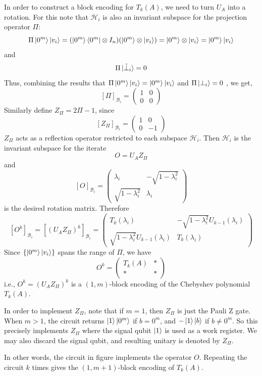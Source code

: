 \documentclass[12pt, oneside]{book}
\theoremstyle{definition}
\theoremstyle{definition}
\theoremstyle{remark}
\begin{document}
In order to construct a block encoding for $T_k(A)$, we need to turn $U_A$ into a rotation. For this note that $\mathcal{H}_i$ is also an invariant subspace for the projection operator $\Pi$:
\[
\Pi\ket{0^m}\ket{v_i}=(\ket{0^m}\bra{0^m} \otimes I_n)(\ket{0^m}\otimes \ket{v_i})=\ket{0^m}\otimes \ket{v_i} =\ket{0^m}\ket{v_i}
\]
and
\[
\Pi\ket{\tilde{\perp}_i} = 0
\]
Thus, combining the results that $\Pi\ket{0^m}\ket{v_i}=\ket{0^m}\ket{v_i}$ and $\Pi\ket{\perp_i}=0$ , we get, 
\[
[\Pi]_{\mathcal{B}_i} = \begin{pmatrix} 1 & 0 \\ 0 & 0 \end{pmatrix}
\]
Similarly define $Z_{\Pi} = 2\Pi -1$, since
\[
[Z_{\Pi}]_{\mathcal{B}_i} = \begin{pmatrix} 1 & 0 \\ 0 & -1 \end{pmatrix}
\]
$Z_{\Pi}$ acts as a reflection operator restricted to each subspace $\mathcal{H}_i$. Then $\mathcal{H}_i$ is the invariant subspace for the iterate
\[
O = U_A Z_{\Pi}
\]
and
\[
[O]_{\mathcal{B}_i} = \begin{pmatrix} \lambda_i & -\sqrt{1-\lambda_i^2} \\
 \sqrt{1-\lambda_i^2} & \lambda_i \end{pmatrix} 
\]
is the desired rotation matrix. Therefore
\[
[O^k]_{\mathcal{B}_i} = [(U_AZ_{\Pi})^k]_{\mathcal{B}_i} = \begin{pmatrix} T_k(\lambda_i) & -\sqrt{1-\lambda_i^2}U_{k-1}(\lambda_i) \\
\sqrt{1-\lambda_i^2} U_{k-1}(\lambda_i) & T_k(\lambda_i) \end{pmatrix}
\]
Since $\{\ket{0^m}\ket{v_i} \}$ spans the range of $\Pi$, we have
\[
O^k = \begin{pmatrix} T_k(A) & * \\ 
* & * \end{pmatrix}
\]
i.e., $O^k = (U_A Z_{\Pi})^k$ is a $(1,m)$-block encoding of the Chebyshev polynomial $T_k(A)$.

In order to implement $Z_{\Pi}$, note that if $m=1$, then $Z_{\Pi}$ is just the Pauli Z gate. When $m>1$, the circuit returns $\ket{1}\ket{0^m}$ if $b=0^m$, and $-\ket{1}\ket{b}$ if $b\neq 0^m$. So this precisely implements $Z_{\Pi}$ where the signal qubit $\ket{1}$ is used as a work register. We may also discard the signal qubit, and resulting unitary is denoted by $Z_{\Pi}$. 

In other words, the circuit in figure implements the operator $O$. Repeating the circuit $k$ times gives the $(1,m+1)$-block encoding of $T_k(A)$.
\end{document}
